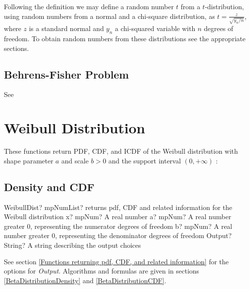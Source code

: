 Following the definition we may define a random number $t$ from a $t$-distribution, using
random numbers from a normal and a chi-square distribution, as $t=\frac{z}{\sqrt{y_n/n}}$, 
where $z$ is a standard normal and $y_n$ a chi-squared variable with $n$ degrees of freedom. To obtain random numbers from these distributions see the appropriate sections.



\subsection{Behrens-Fisher Problem}

See \cite{Golhar_1972}





\section{Weibull Distribution}
\label{WeibullDistribution}

These functions return PDF, CDF, and ICDF of the Weibull distribution with shape parameter $a$ and scale
$b > 0$ and the support interval $(0,+\infty)$ :



\subsection{Density and CDF}

\begin{mpFunctionsExtract}
	\mpFunctionFour
	{WeibullDist? mpNumList? returns pdf, CDF and related information for the Weibull distribution}
	{x? mpNum? A real number}
	{a? mpNum? A real number greater 0, representing the numerator  degrees of freedom}
	{b? mpNum? A real number greater 0, representing the denominator degrees of freedom}
	{Output? String? A string describing the output choices}
\end{mpFunctionsExtract}


\vspace{0.3cm}
See section \ref{Functions returning pdf, CDF, and related information} for the options for {\itshape\sffamily Output}. Algorithms and formulas are given in sections \ref{BetaDistributionDensity} and \ref{BetaDistributionCDF}.


